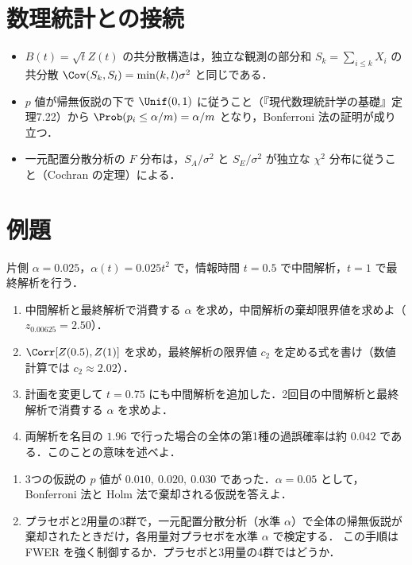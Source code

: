 \section{数理統計との接続}\label{sec:14-link}
\begin{linkbox}
\begin{itemize}
\item $B(t)=\sqrt tZ(t)$ の共分散構造は，独立な観測の部分和 $S_k=\sum_{i\le k}X_i$ の共分散 $\Cov(S_k,S_l)=\min(k,l)\sigma^2$ と同じである．
\item $p$ 値が帰無仮説の下で $\Unif(0,1)$ に従うこと（『現代数理統計学の基礎』定理7.22）から $\Prob(p_i\le\alpha/m)=\alpha/m$ となり，Bonferroni 法の証明が成り立つ．
\item 一元配置分散分析の $F$ 分布は，$S_A/\sigma^2$ と $S_E/\sigma^2$ が独立な $\chi^2$ 分布に従うこと（Cochran の定理）による．
\end{itemize}
\end{linkbox}

\section{例題}\label{sec:14-ex}
\begin{reidai}\label{reidai:14-1}
片側 $\alpha=0.025$，$\alpha(t)=0.025t^2$ で，情報時間 $t=0.5$ で中間解析，$t=1$ で最終解析を行う．
\begin{enumerate}[label=(\arabic*)]
\item 中間解析と最終解析で消費する $\alpha$ を求め，中間解析の棄却限界値を求めよ（$z_{0.00625}=2.50$）．
\item $\Corr[Z(0.5),Z(1)]$ を求め，最終解析の限界値 $c_2$ を定める式を書け（数値計算では $c_2\approx2.02$）．
\item 計画を変更して $t=0.75$ にも中間解析を追加した．2回目の中間解析と最終解析で消費する $\alpha$ を求めよ．
\item 両解析を名目の $1.96$ で行った場合の全体の第1種の過誤確率は約 $0.042$ である．このことの意味を述べよ．
\end{enumerate}
\end{reidai}

\begin{reidai}[多重性]\label{reidai:14-2}
\begin{enumerate}[label=(\arabic*)]
\item 3つの仮説の $p$ 値が $0.010,\ 0.020,\ 0.030$ であった．$\alpha=0.05$ として，Bonferroni 法と Holm 法で棄却される仮説を答えよ．
\item プラセボと2用量の3群で，一元配置分散分析（水準 $\alpha$）で全体の帰無仮説が棄却されたときだけ，各用量対プラセボを水準 $\alpha$ で検定する．
      この手順は FWER を強く制御するか．プラセボと3用量の4群ではどうか．
\end{enumerate}
\end{reidai}

